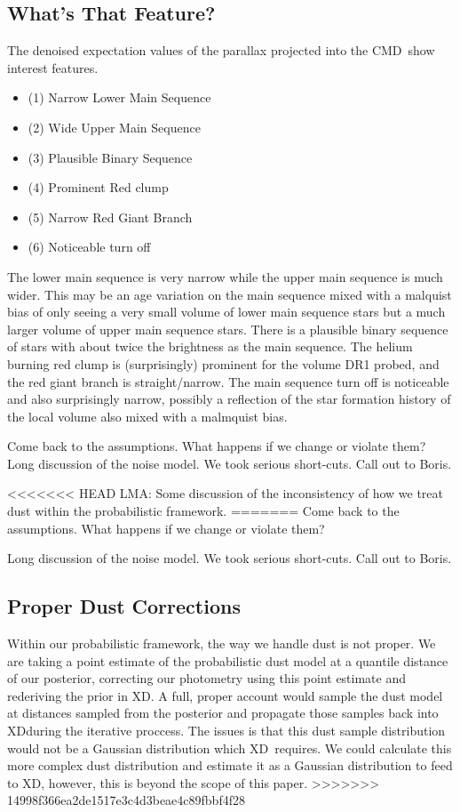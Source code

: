 \documentclass[modern]{aastex61}
\newcommand{\acronym}[1]{{\small{#1}}}
\newcommand{\xd}{\acronym{XD}}
\newcommand{\cmd}{\acronym{CMD}}
\begin{document}
\subsection{What's That Feature?}
The denoised expectation values of the parallax projected into the \cmd\ show interest features.
\begin{itemize}
\item (1) Narrow Lower Main Sequence
\item (2) Wide Upper Main Sequence
\item (3) Plausible Binary Sequence
\item (4) Prominent Red clump
\item (5) Narrow Red Giant Branch
\item (6) Noticeable turn off
\end{itemize}
The lower main sequence is very narrow while the upper main sequence is much wider. This may be an age variation on the main sequence mixed with a malquist bias of only seeing a very small volume of lower main sequence stars but a much larger volume of upper main sequence stars. There is a plausible binary sequence of stars with about twice the brightness as the main sequence. The helium burning red clump is (surprisingly) prominent for the volume DR1 probed, and the red giant branch is straight/narrow. The main sequence turn off is noticeable and also surprisingly narrow, possibly a reflection of the star formation history of the local volume also mixed with a malmquist bias.

Come back to the assumptions. What happens if we change or violate them? Long discussion of the noise model. We took serious short-cuts. Call out to Boris.

<<<<<<< HEAD
LMA: Some discussion of the inconsistency of how we treat dust within the probabilistic framework.
=======
Come back to the assumptions. What happens if we change or violate them?

Long discussion of the noise model. We took serious short-cuts. Call out to Boris.

\subsection{Proper Dust Corrections}
Within our probabilistic framework, the way we handle dust is not proper. We are taking a point estimate of the probabilistic dust model at a quantile distance of our posterior, correcting our photometry using this point estimate and rederiving the prior in \xd. A full, proper account would sample the dust model at distances sampled from the posterior and propagate those samples back into \xd during the iterative proccess. The issues is that this dust sample distribution would not be a Gaussian distribution which \xd\ requires. We could calculate this more complex dust distribution and estimate it as a Gaussian distribution to feed to \xd, however, this is beyond the scope of this paper.
>>>>>>> 14998f366ea2de1517e3c4d3beae4c89fbbf4f28
\end{document}
